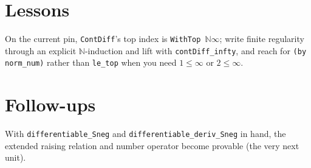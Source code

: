 \documentclass[11pt]{article}
\begin{document}
\section{Lessons}
On the current pin, \texttt{ContDiff}'s top index is \texttt{WithTop $\mathbb N\infty$}; write finite
regularity through an explicit $\mathbb N$-induction and lift with \texttt{contDiff\_infty}, and reach
for \texttt{(by norm\_num)} rather than \texttt{le\_top} when you need $1\le\infty$ or $2\le\infty$.

\section{Follow-ups}
With \texttt{differentiable\_Sneg} and \texttt{differentiable\_deriv\_Sneg} in hand, the extended
raising relation and number operator become provable (the very next unit).
\end{document}
